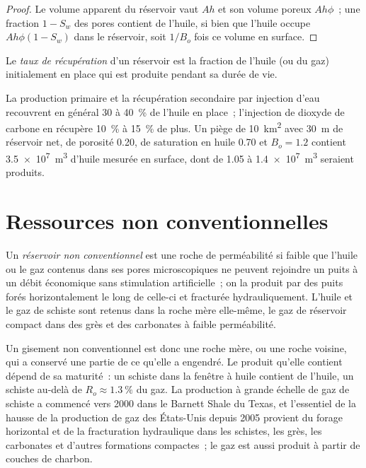 \begin{proof}
Le volume apparent du réservoir vaut $Ah$ et son volume poreux $Ah\phi$~; une fraction $1 - S_w$ des
pores contient de l'huile, si bien que l'huile occupe $Ah\phi(1 - S_w)$ dans le réservoir, soit $1/B_o$ fois
ce volume en surface.
\end{proof}

\begin{definition}\label{def:b2:energy-geology:volumetrics}
Le \emph{taux de récupération} d'un réservoir est la fraction de l'huile (ou du gaz)
initialement en place qui est produite pendant sa durée de vie.
\end{definition}

La production primaire et la récupération secondaire par injection d'eau recouvrent en général 30 à \qty{40}{\percent} de l'huile en place~; l'injection de dioxyde de carbone
en récupère \qty{10}{\percent} à \qty{15}{\percent} de plus. Un piège de \qty{10}{km^2} avec \qty{30}{m} de réservoir net,
de porosité 0.20, de saturation en huile 0.70 et $B_o = 1.2$ contient \qty{3.5e7}{m^3} d'huile mesurée en surface, dont
de 1.05 à \qty{1.4e7}{m^3} seraient produits.

\section{Ressources non conventionnelles}\label{sec:b2:energy-geology:unconventional}

\begin{definition}\label{def:b2:energy-geology:unconventional}
Un \emph{réservoir non conventionnel} est une roche de perméabilité si faible que l'huile ou le gaz
contenus dans ses pores microscopiques ne peuvent rejoindre un puits à un débit économique sans stimulation artificielle~;
on la produit par des puits forés horizontalement le long de celle-ci et
fracturée hydrauliquement. L'huile et le gaz de schiste sont retenus dans la roche mère elle-même, le gaz de réservoir compact
dans des grès et des carbonates à faible perméabilité.
\end{definition}

Un gisement non conventionnel est donc une roche mère, ou une roche voisine, qui a conservé une partie de ce qu'elle a engendré.
Le produit qu'elle contient dépend de sa maturité~: un schiste dans la fenêtre à huile contient de l'huile,
un schiste au-delà de $R_o \approx \qty{1.3}{\percent}$ du gaz. La production à grande échelle de gaz de schiste a commencé vers
2000 dans le Barnett Shale du Texas, et l'essentiel de la hausse de la production de gaz des États-Unis depuis
2005 provient du forage horizontal et de la fracturation hydraulique dans les schistes, les grès, les carbonates et d'autres
formations compactes~; le gaz est aussi produit à partir de couches de charbon.

